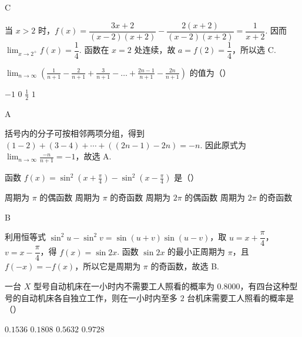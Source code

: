 \begin{answer}
C
\end{answer}

\begin{solution}
当 \(x>2\) 时，\(f(x)=\dfrac{3x+2}{(x-2)(x+2)}-\dfrac{2(x+2)}{(x-2)(x+2)}=\dfrac{1}{x+2}\). 因而 \(\displaystyle\lim_{x\to2^+}f(x)=\dfrac14\). 函数在 \(x=2\) 处连续，故 \(a=f(2)=\dfrac14\)，所以选 C.
\end{solution}

\begin{problem}
\(\displaystyle\lim_{n\to \infty}\left(\frac{1}{n + 1} -\frac{2}{n + 1} +\frac{3}{n + 1} -\dots +\frac{2n - 1}{n + 1} -\frac{2n}{n + 1}\right)\) 的值为（\quad）

\choices
    {\(-1\)}
    {\(0\)}
    {\(\frac{1}{2}\)}
    {\(1\)}
\end{problem}

\begin{answer}
A
\end{answer}

\begin{solution}
括号内的分子可按相邻两项分组，得到 \((1-2)+(3-4)+\cdots+((2n-1)-2n)=-n\). 因此原式为 \(\displaystyle\lim_{n\to\infty}\frac{-n}{n+1}=-1\)，故选 A.
\end{solution}

\begin{problem}
函数 \( f(x) = \sin^2\left(x + \frac{\pi}{4}\right) - \sin^2\left(x - \frac{\pi}{4}\right) \) 是（\quad）

\choices
    {周期为 \(\pi\) 的偶函数}
    {周期为 \(\pi\) 的奇函数}
    {周期为 \(2\pi\) 的偶函数}
    {周期为 \(2\pi\) 的奇函数}
\end{problem}

\begin{answer}
B
\end{answer}

\begin{solution}
利用恒等式 \(\sin^2u-\sin^2v=\sin(u+v)\sin(u-v)\)，取 \(u=x+\dfrac\pi4\)，\(v=x-\dfrac\pi4\)，得 \(f(x)=\sin2x\). 函数 \(\sin2x\) 的最小正周期为 \(\pi\)，且 \(f(-x)=-f(x)\)，所以它是周期为 \(\pi\) 的奇函数，故选 B.
\end{solution}

\begin{problem}
一台 \(X\) 型号自动机床在一小时内不需要工人照看的概率为 \(0.8000\)，有四台这种型号的自动机床各自独立工作，则在一小时内至多 \(2\) 台机床需要工人照看的概率是（\quad）

\choices
    {\(0.1536\)}
    {\(0.1808\)}
    {\(0.5632\)}
    {\(0.9728\)}
\end{problem}

